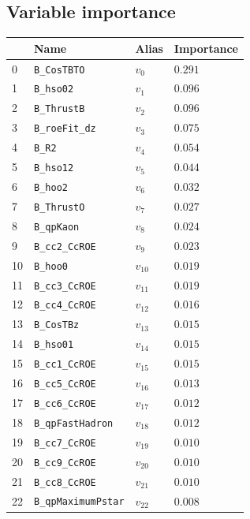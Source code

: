 \subsection*{Variable importance}

\begin{longtable}{| p{} | p{} | p{} |p{} |}
\hline
& Name & Alias & Importance \\ \hline
0 &\texttt{B\_CosTBTO} & $v_{0}$ & $0.291$ \\ \hline
1 &\texttt{B\_hso02} & $v_{1}$ & $0.096$ \\ \hline
2 &\texttt{B\_ThrustB} & $v_{2}$ & $0.096$ \\ \hline
3 &\texttt{B\_roeFit\_dz} & $v_{3}$ & $0.075$ \\ \hline
4 &\texttt{B\_R2} & $v_{4}$ & $0.054$ \\ \hline
5 &\texttt{B\_hso12} & $v_{5}$ & $0.044$ \\ \hline
6 &\texttt{B\_hoo2} & $v_{6}$ & $0.032$ \\ \hline
7 &\texttt{B\_ThrustO} & $v_{7}$ & $0.027$ \\ \hline
8 &\texttt{B\_qpKaon} & $v_{8}$ & $0.024$ \\ \hline
9 &\texttt{B\_cc2\_CcROE} & $v_{9}$ & $0.023$ \\ \hline
10 &\texttt{B\_hoo0} & $v_{10}$ & $0.019$ \\ \hline
11 &\texttt{B\_cc3\_CcROE} & $v_{11}$ & $0.019$ \\ \hline
12 &\texttt{B\_cc4\_CcROE} & $v_{12}$ & $0.016$ \\ \hline
13 &\texttt{B\_CosTBz} & $v_{13}$ & $0.015$ \\ \hline
14 &\texttt{B\_hso01} & $v_{14}$ & $0.015$ \\ \hline
15 &\texttt{B\_cc1\_CcROE} & $v_{15}$ & $0.015$ \\ \hline
16 &\texttt{B\_cc5\_CcROE} & $v_{16}$ & $0.013$ \\ \hline
17 &\texttt{B\_cc6\_CcROE} & $v_{17}$ & $0.012$ \\ \hline
18 &\texttt{B\_qpFastHadron} & $v_{18}$ & $0.012$ \\ \hline
19 &\texttt{B\_cc7\_CcROE} & $v_{19}$ & $0.010$ \\ \hline
20 &\texttt{B\_cc9\_CcROE} & $v_{20}$ & $0.010$ \\ \hline
21 &\texttt{B\_cc8\_CcROE} & $v_{21}$ & $0.010$ \\ \hline
22 &\texttt{B\_qpMaximumPstar} & $v_{22}$ & $0.008$ \\ \hline

\end{longtable}
